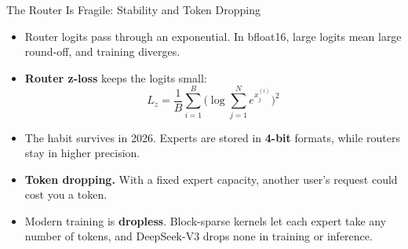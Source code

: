\begin{frame}{The Router Is Fragile: Stability and Token Dropping}
    \begin{itemize}\itemsep0.33em
        \item Router logits pass through an exponential. In bfloat16, large logits mean large round-off, and training diverges.
        \item \textbf{Router z-loss} keeps the logits small:
        \[
            L_z=\frac1B\sum_{i=1}^{B}\Big(\log\sum_{j=1}^{N}e^{x^{(i)}_j}\Big)^2
        \]
        \item The habit survives in 2026. Experts are stored in \textbf{4-bit} formats, while routers stay in higher precision.
        \item \textbf{Token dropping.} With a fixed expert capacity, another user's request could cost you a token.
        \item Modern training is \textbf{dropless}. Block-sparse kernels let each expert take any number of tokens, and DeepSeek-V3 drops none in training or inference.
    \end{itemize}
\end{frame}

